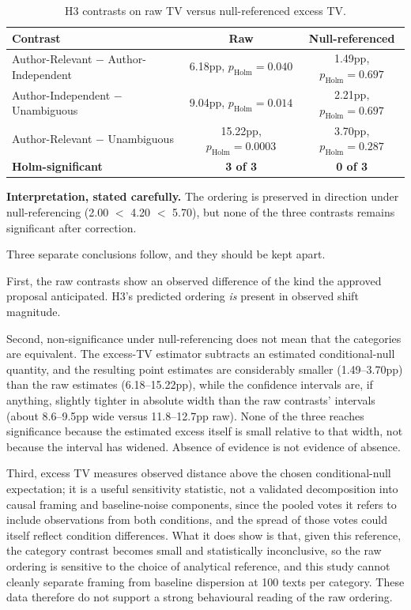 \begin{table}[h]
\centering
\footnotesize
\caption{H3 contrasts on raw TV versus null-referenced excess TV.}
\label{tab:h3compare}
\begin{tabular}{lcc}
\hline
\textbf{Contrast} & \textbf{Raw} & \textbf{Null-referenced} \\
\hline
Author-Relevant $-$ Author-Independent & 6.18pp, $p_{\text{Holm}} = 0.040$ & 1.49pp, $p_{\text{Holm}} = 0.697$ \\
Author-Independent $-$ Unambiguous & 9.04pp, $p_{\text{Holm}} = 0.014$ & 2.21pp, $p_{\text{Holm}} = 0.697$ \\
Author-Relevant $-$ Unambiguous & 15.22pp, $p_{\text{Holm}} = 0.0003$ & 3.70pp, $p_{\text{Holm}} = 0.287$ \\
\hline
\textbf{Holm-significant} & \textbf{3 of 3} & \textbf{0 of 3} \\
\hline
\end{tabular}
\end{table}

\noindent
\textbf{Interpretation, stated carefully.} The ordering is preserved in direction under
null-referencing (2.00 $<$ 4.20 $<$ 5.70), but none of the three contrasts remains
significant after correction.

Three separate conclusions follow, and they should be kept apart.

First, the raw contrasts show an observed difference of the kind the approved proposal
anticipated. H3's predicted ordering \emph{is} present in observed shift magnitude.

Second, non-significance under null-referencing does not mean that the categories are equivalent.
The excess-TV estimator subtracts an estimated conditional-null quantity, and the resulting point
estimates are considerably smaller (1.49--3.70pp) than the raw estimates (6.18--15.22pp), while
the confidence intervals are, if anything, slightly tighter in absolute width than the raw contrasts'
intervals (about 8.6--9.5pp wide versus 11.8--12.7pp raw). None of the three reaches significance
because the estimated excess itself is small relative to that width, not because the interval has
widened. Absence of evidence is not evidence of absence.

Third, excess TV measures observed distance above the chosen conditional-null expectation; it is a
useful sensitivity statistic, not a validated decomposition into causal framing and baseline-noise
components, since the pooled votes it refers to include observations from both conditions, and the
spread of those votes could itself reflect condition differences. What it does show is that, given
this reference, the category contrast becomes small and statistically inconclusive, so the raw
ordering is sensitive to the choice of analytical reference, and this study cannot cleanly
separate framing from baseline dispersion at 100 texts per category. These data therefore do not
support a strong behavioural reading of the raw ordering.

